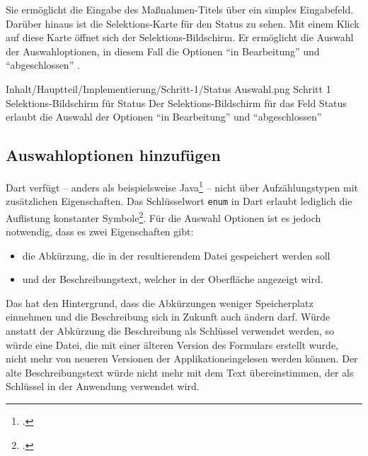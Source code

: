Sie ermöglicht die Eingabe des Maßnahmen-Titels über ein simples Eingabefeld. Darüber hinaus ist die Selektions-Karte für den Status zu sehen. Mit einem Klick auf diese Karte öffnet sich der Selektions-Bildschirm. Er ermöglicht die Auswahl der Auswahloptionen, in diesem Fall die Optionen \enquote{in Bearbeitung} und \enquote{abgeschlossen}
\Abb{\ref{fig:Schritt1SelektionsBildschirmStatus}}.

\begin{alexfigure}{Inhalt/Hauptteil/Implementierung/Schritt-1/Status Auswahl.png}
  {Schritt 1 Selektions-Bildschirm für Status}
  {Der Selektions-Bildschirm für das Feld Status erlaubt die Auswahl der Optionen \enquote{in Bearbeitung} und \enquote{abgeschlossen}}

  \label{fig:Schritt1SelektionsBildschirmStatus}

\end{alexfigure}


\subsection{Auswahloptionen hinzufügen}

Dart verfügt – anders als beispielsweise Java\footcite[Vgl.][S. 321]{TheJavaLanguageSpecificationJavaSE16Edition} – nicht über Aufzählungstypen mit zusätzlichen Eigenschaften. Das Schlüsselwort \texttt{enum} in Dart erlaubt lediglich die Auflistung konstanter Symbole\footcite[Vgl.][S. 74f.]{DartProgrammingLanguageSpecification5thedition}. Für die Auswahl Optionen ist es jedoch notwendig, dass es zwei Eigenschaften gibt:
\begin{itemize}
  \parsep 0pt
  \topsep 0pt
  \itemsep 0pt

  \item die Abkürzung, die in der resultierendem Datei gespeichert werden soll
  \item und der Beschreibungstext, welcher in der Oberfläche angezeigt wird.
\end{itemize}
Das hat den Hintergrund, dass die Abkürzungen weniger Speicherplatz einnehmen und die Beschreibung sich in Zukunft auch ändern darf. Würde anstatt der Abkürzung die Beschreibung als Schlüssel verwendet werden, so würde eine Datei, die mit einer älteren Version des Formulars erstellt wurde, nicht mehr von neueren Versionen der Applikationeingelesen werden können. Der alte Beschreibungstext würde nicht mehr mit dem Text übereinstimmen, der als Schlüssel in der Anwendung verwendet wird.


